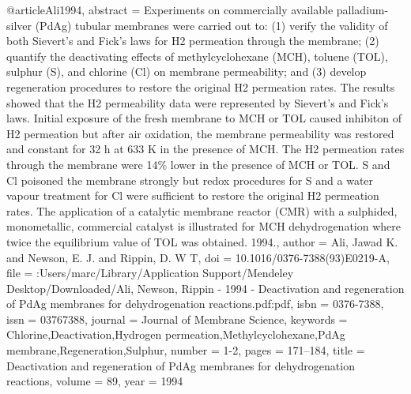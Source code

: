 @article{Ali1994,
abstract = {Experiments on commercially available palladium-silver (PdAg) tubular membranes were carried out to: (1) verify the validity of both Sievert's and Fick's laws for H2 permeation through the membrane; (2) quantify the deactivating effects of methylcyclohexane (MCH), toluene (TOL), sulphur (S), and chlorine (Cl) on membrane permeability; and (3) develop regeneration procedures to restore the original H2 permeation rates. The results showed that the H2 permeability data were represented by Sievert's and Fick's laws. Initial exposure of the fresh membrane to MCH or TOL caused inhibiton of H2 permeation but after air oxidation, the membrane permeability was restored and constant for 32 h at 633 K in the presence of MCH. The H2 permeation rates through the membrane were 14{\%} lower in the presence of MCH or TOL. S and Cl poisoned the membrane strongly but redox procedures for S and a water vapour treatment for Cl were sufficient to restore the original H2 permeation rates. The application of a catalytic membrane reactor (CMR) with a sulphided, monometallic, commercial catalyst is illustrated for MCH dehydrogenation where twice the equilibrium value of TOL was obtained. {\textcopyright} 1994.},
author = {Ali, Jawad K. and Newson, E. J. and Rippin, D. W T},
doi = {10.1016/0376-7388(93)E0219-A},
file = {:Users/marc/Library/Application Support/Mendeley Desktop/Downloaded/Ali, Newson, Rippin - 1994 - Deactivation and regeneration of PdAg membranes for dehydrogenation reactions.pdf:pdf},
isbn = {0376-7388},
issn = {03767388},
journal = {Journal of Membrane Science},
keywords = {Chlorine,Deactivation,Hydrogen permeation,Methylcyclohexane,PdAg membrane,Regeneration,Sulphur},
number = {1-2},
pages = {171--184},
title = {{Deactivation and regeneration of PdAg membranes for dehydrogenation reactions}},
volume = {89},
year = {1994}
}
